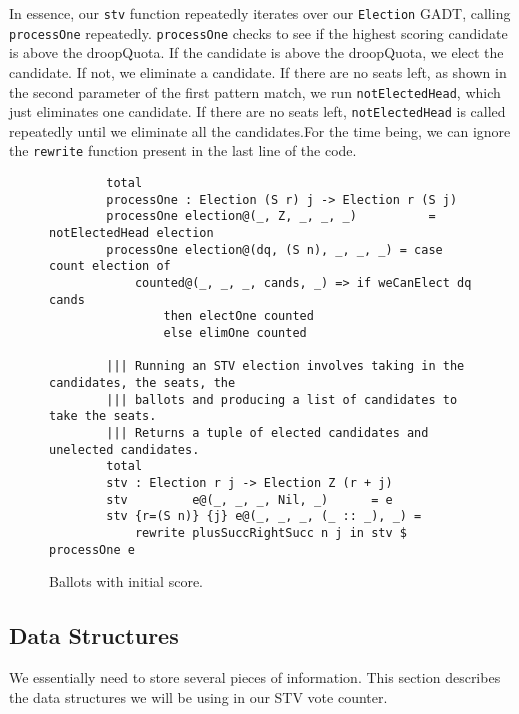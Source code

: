 In essence, our \texttt{stv} function repeatedly iterates over our
\texttt{Election} GADT, calling \texttt{processOne} repeatedly.
\texttt{processOne} checks to see if the highest scoring candidate is above the
droopQuota. If the candidate is above the droopQuota, we elect the candidate. If
not, we eliminate a candidate. If there are no seats left, as shown in the
second parameter of the first pattern match, we run \texttt{notElectedHead},
which just eliminates one candidate. If there are no seats left,
\texttt{notElectedHead} is called repeatedly until we eliminate all the
candidates.For the time being, we can ignore the \texttt{rewrite} function
present in the last line of the code. 

\begin{figure}[htbp!!!!!!!!]
	\caption{Ballots with initial score.}
	\label{overall_code}
	\begin{lstlisting}
        total
        processOne : Election (S r) j -> Election r (S j)
        processOne election@(_, Z, _, _, _)          = notElectedHead election
        processOne election@(dq, (S n), _, _, _) = case count election of
            counted@(_, _, _, cands, _) => if weCanElect dq cands
                then electOne counted
                else elimOne counted

        ||| Running an STV election involves taking in the candidates, the seats, the
        ||| ballots and producing a list of candidates to take the seats. 
        ||| Returns a tuple of elected candidates and unelected candidates.
        total
        stv : Election r j -> Election Z (r + j)
        stv         e@(_, _, _, Nil, _)      = e
        stv {r=(S n)} {j} e@(_, _, _, (_ :: _), _) = 
            rewrite plusSuccRightSucc n j in stv $ processOne e
    \end{lstlisting}
\end{figure}

\subsection{Data Structures}

We essentially need to store several pieces of information. This section
describes the data structures we will be using in our STV vote counter.

